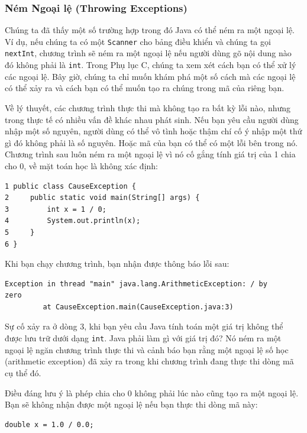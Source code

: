\subsubsection{Ném Ngoại lệ (Throwing
Exceptions)}\label{nuxe9m-ngoux1ea1i-lux1ec7-throwing-exceptions}

Chúng ta đã thấy một số trường hợp trong đó Java có thể ném ra một ngoại
lệ. Ví dụ, nếu chúng ta có một \texttt{Scanner} cho bảng điều khiển và
chúng ta gọi \texttt{nextInt}, chương trình sẽ ném ra một ngoại lệ nếu
người dùng gõ nội dung nào đó không phải là \texttt{int}. Trong Phụ lục
C, chúng ta xem xét cách bạn có thể xử lý các ngoại lệ. Bây giờ, chúng
ta chỉ muốn khám phá một số cách mà các ngoại lệ có thể xảy ra và cách
bạn có thể muốn tạo ra chúng trong mã của riêng bạn.

Về lý thuyết, các chương trình thực thi mà không tạo ra bất kỳ lỗi nào,
nhưng trong thực tế có nhiều vấn đề khác nhau phát sinh. Nếu bạn yêu cầu
người dùng nhập một số nguyên, người dùng có thể vô tình hoặc thậm chí
cố ý nhập một thứ gì đó không phải là số nguyên. Hoặc mã của bạn có thể
có một lỗi bên trong nó. Chương trình sau luôn ném ra một ngoại lệ vì nó
cố gắng tính giá trị của 1 chia cho 0, về mặt toán học là không xác
định:

\begin{verbatim}
1 public class CauseException {
2     public static void main(String[] args) {
3         int x = 1 / 0;
4         System.out.println(x);
5     }
6 }
\end{verbatim}

Khi bạn chạy chương trình, bạn nhận được thông báo lỗi sau:

\begin{verbatim}
Exception in thread "main" java.lang.ArithmeticException: / by 
zero 
         at CauseException.main(CauseException.java:3)
\end{verbatim}

Sự cố xảy ra ở dòng 3, khi bạn yêu cầu Java tính toán một giá trị không
thể được lưu trữ dưới dạng \texttt{int}. Java phải làm gì với giá trị
đó? Nó ném ra một ngoại lệ ngăn chương trình thực thi và cảnh báo bạn
rằng một ngoại lệ số học (arithmetic exception) đã xảy ra trong khi
chương trình đang thực thi dòng mã cụ thể đó.

Điều đáng lưu ý là phép chia cho 0 không phải lúc nào cũng tạo ra một
ngoại lệ. Bạn sẽ không nhận được một ngoại lệ nếu bạn thực thi dòng mã
này:

\begin{verbatim}
double x = 1.0 / 0.0;
\end{verbatim}

